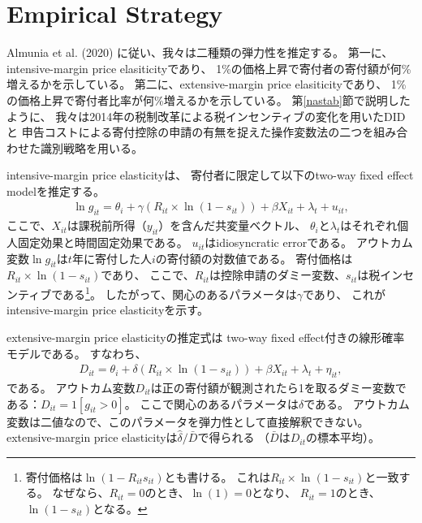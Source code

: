 \documentclass[
  11pt,
  a4paper,
]{article}
\begin{document}
\hypertarget{estimation}{%
\section{Empirical Strategy}\label{estimation}}

Almunia et al. (2020) に従い、我々は二種類の弾力性を推定する。
第一に、intensive-margin price elasiticityであり、
1\%の価格上昇で寄付者の寄付額が何\%増えるかを示している。
第二に、extensive-margin price elasiticityであり、
1\%の価格上昇で寄付者比率が何\%増えるかを示している。
第\ref{nastab}節で説明したように、
我々は2014年の税制改革による税インセンティブの変化を用いたDIDと
申告コストによる寄付控除の申請の有無を捉えた操作変数法の二つを組み合わせた識別戦略を用いる。

intensive-margin price elasticityは、
寄付者に限定して以下のtwo-way fixed effect modelを推定する。
\begin{align}
  \ln g_{it} = \theta_i + \gamma (R_{it} \times \ln (1 - s_{it}))
    + \beta X_{it} + \lambda_t + u_{it}, \label{eq:intensive}
\end{align}
ここで、\(X_{it}\)は課税前所得（\(y_{it}\)）を含んだ共変量ベクトル、
\(\theta_i\)と\(\lambda_t\)はそれぞれ個人固定効果と時間固定効果である。
\(u_{it}\)はidiosyncratic errorである。
アウトカム変数\(\ln g_{it}\)は\(t\)年に寄付した人\(i\)の寄付額の対数値である。
寄付価格は\(R_{it} \times \ln (1 - s_{it})\)であり、
ここで、\(R_{it}\)は控除申請のダミー変数、\(s_{it}\)は税インセンティブである\footnote{寄付価格は\(\ln(1 - R_{it}s_{it})\)とも書ける。
  これは\(R_{it} \times \ln (1 - s_{it})\)と一致する。
  なぜなら、\(R_{it} = 0\)のとき、\(\ln(1) = 0\)となり、
  \(R_{it} = 1\)のとき、\(\ln(1 - s_{it})\)となる。}。
したがって、関心のあるパラメータは\(\gamma\)であり、
これがintensive-margin price elasticityを示す。

extensive-margin price elasticityの推定式は
two-way fixed effect付きの線形確率モデルである。
すなわち、
\begin{align}
  D_{it} = \theta_i + \delta (R_{it} \times \ln (1 - s_{it}))
    + \beta X_{it} + \lambda_t + \eta_{it}, \label{eq:extensive}
\end{align}
である。
アウトカム変数\(D_{it}\)は正の寄付額が観測されたら1を取るダミー変数である：\(D_{it} = 1[g_{it} > 0]\)。
ここで関心のあるパラメータは\(\delta\)である。
アウトカム変数は二値なので、このパラメータを弾力性として直接解釈できない。
extensive-margin price elasticityは\(\hat{\delta} / \bar{D}\)で得られる
（\(\bar{D}\)は\(D_{it}\)の標本平均）。
\end{document}

